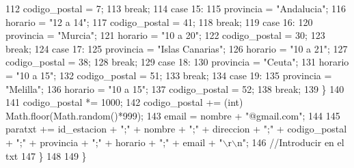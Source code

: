 \begin{DoxyCode}
112                     codigo\_postal = 7;
113                     \textcolor{keywordflow}{break};
114                     \textcolor{keywordflow}{case} 15:
115                     provincia = \textcolor{stringliteral}{"Andalucia"};
116                     horario = \textcolor{stringliteral}{"12 a 14"};
117                     codigo\_postal = 41;
118                     \textcolor{keywordflow}{break};
119                     \textcolor{keywordflow}{case} 16:
120                     provincia = \textcolor{stringliteral}{"Murcia"};
121                     horario = \textcolor{stringliteral}{"10 a 20"};
122                     codigo\_postal = 30;
123                     \textcolor{keywordflow}{break};
124                     \textcolor{keywordflow}{case} 17:
125                     provincia = \textcolor{stringliteral}{"Islas Canarias"};
126                     horario = \textcolor{stringliteral}{"10 a 21"};
127                     codigo\_postal = 38;
128                     \textcolor{keywordflow}{break};
129                     \textcolor{keywordflow}{case} 18:
130                     provincia = \textcolor{stringliteral}{"Ceuta"};
131                     horario = \textcolor{stringliteral}{"10 a 15"};
132                     codigo\_postal = 51;
133                     \textcolor{keywordflow}{break};
134                     \textcolor{keywordflow}{case} 19:
135                     provincia = \textcolor{stringliteral}{"Melilla"};
136                     horario = \textcolor{stringliteral}{"10 a 15"};
137                     codigo\_postal = 52;
138                     \textcolor{keywordflow}{break};
139             \}
140             
141             codigo\_postal *= 1000;
142             codigo\_postal += (int) Math.floor(Math.random()*999);   
143             email = nombre + \textcolor{stringliteral}{"@gmail.com"};
144             
145             paratxt += id\_estacion + \textcolor{stringliteral}{";"} + nombre + \textcolor{stringliteral}{";"} + direccion + \textcolor{stringliteral}{";"} + codigo\_postal + \textcolor{stringliteral}{";"} + provincia
       + \textcolor{stringliteral}{";"} + horario + \textcolor{stringliteral}{";"} + email + \textcolor{stringliteral}{"\(\backslash\)r\(\backslash\)n"};
146             \textcolor{comment}{//Introducir en el txt}
147         \}
148         
149     \}
\end{DoxyCode}
\mbox{\label{classjavaapplication20_1_1_java_application20_a1dd2d7b69c9e7a7adaffce66b9653943}} 
